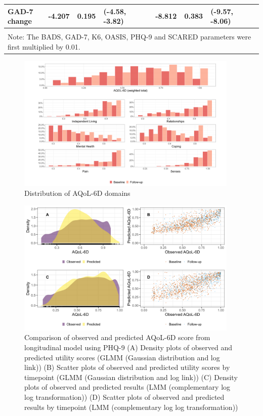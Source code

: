 \documentclass[
  journal=largetwo,
  manuscript=original-article,
  year=2023-Submission,
]{cup-journal}
\begin{document}
\begin{table}
\begin{tabular}[t]{lll>{\raggedright\arraybackslash}p{6em}llll>{\raggedright\arraybackslash}p{6em}ll}
\cmidrule{1-11}
GAD-7 change & -4.207 & 0.195 & (-4.58, -3.82) &  &  & -8.812 & 0.383 & (-9.57, -8.06) &  & \\
\bottomrule
\multicolumn{11}{l}{\rule{0pt}{1em}\textit{ }}\\
\multicolumn{11}{l}{\rule{0pt}{1em}Note: The BADS, GAD-7, K6, OASIS, PHQ-9 and SCARED parameters were first multiplied by 0.01.}\\
\end{tabular}
\end{table}

\newpage

\begin{figure}
\includegraphics[width=400px]{combined_utl} \caption{Distribution of AQoL-6D domains}\label{fig:fig1}
\end{figure}

\begin{figure}
\includegraphics[width=400px]{dens_and_sctr} \caption{Comparison of observed and predicted AQoL-6D score from longitudinal model using PHQ-9 (A) Density plots of observed and predicted utility scores (GLMM (Gaussian distribution and log link)) (B) Scatter plots of observed and predicted utility scores by timepoint (GLMM (Gaussian distribution and log link)) (C) Density plots of observed and predicted results (LMM (complementary log log transformation)) (D) Scatter plots of observed and predicted results by timepoint (LMM (complementary log log transformation))}\label{fig:fig2}
\end{figure}

\newpage

\end{document}
